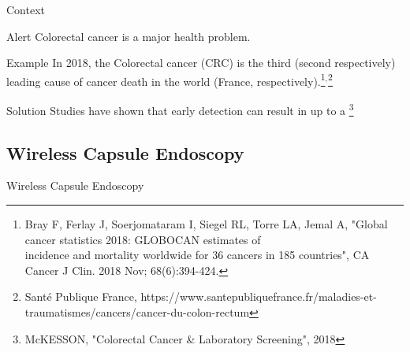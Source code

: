 \documentclass{libs/ufc_format}
\begin{document}
\begin{frame}{Context}
    \begin{alertblock}{Alert}
        Colorectal cancer is a major health problem.
    \end{alertblock}
    \pause
    \begin{block}{Example}
        In 2018, the Colorectal cancer (CRC) is the third (second respectively) leading cause of cancer death in the world (France, respectively).\footnote[frame]{\tiny Bray F, Ferlay J, Soerjomataram I, Siegel RL, Torre LA, Jemal A, "Global cancer statistics 2018: GLOBOCAN estimates of \\ \hspace{0.3cm}incidence and mortality worldwide for 36 cancers in 185 countries", CA Cancer J Clin. 2018 Nov; 68(6):394-424.}$^{,}$\footnote[frame]{\tiny Santé Publique France, https://www.santepubliquefrance.fr/maladies-et-traumatismes/cancers/cancer-du-colon-rectum}
    \end{block}
    \pause
    \begin{exampleblock}{Solution}
        Studies have shown that early detection can result in up to a \footnote[frame]{\tiny McKESSON, "Colorectal Cancer \& Laboratory Screening", 2018}
    \end{exampleblock}

\end{frame}


\subsection{Wireless Capsule Endoscopy}
\begin{frame}{Wireless Capsule Endoscopy}


    \pause


\end{frame}
\end{document}
